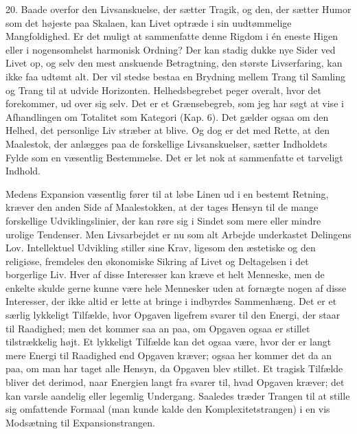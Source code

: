 \documentclass[12pt]{article}
\newcommand{\apage}[1]{\marginnote{\footnotesize\textit{[#1]}}}
\begin{document}
20. Baade overfor den Livsanskuelse, der sætter Tragik, og den, der
sætter Humor som det højeste paa Skalaen, kan Livet optræde i sin
uudtømmelige Mangfoldighed. Er det muligt at sammenfatte denne Rigdom i
én eneste Higen eller i nogensomhelst harmonisk Ordning? Der kan
stadig dukke nye Sider ved Livet op, og selv den mest anskuende
Betragtning, den største Livserfaring, kan ikke faa udtømt alt. Der vil
stedse bestaa en Brydning mellem Trang til Samling og Trang til at
udvide Horizonten. Helhedsbegrebet peger overalt, hvor det forekommer,
ud over sig selv. Det er et Grænsebegreb, som jeg har søgt at vise i
Afhandlingen om Totalitet som Kategori (Kap. 6). Det gælder ogsaa om
den Helhed, det personlige Liv stræber at blive. Og dog er det med
Rette, at den Maalestok, der anlægges paa de forskellige
Livsanskuelser, sætter Indholdets Fylde som en væsentlig Bestemmelse.
Det er let nok at sammenfatte et tarveligt Indhold.

\setcounter{footnote}{0}%
\apage{63}Medens Expansion væsentlig fører til at løbe Linen ud i en bestemt
Retning, kræver den anden Side af Maalestokken, at der tages Hensyn til de
mange forskellige Udviklingslinier, der kan røre sig i Sindet som mere eller
mindre urolige Tendenser. Men Livsarbejdet er nu som alt Arbejde underkastet
Delingens Lov. Intellektuel Udvikling stiller sine Krav, ligesom den æstetiske
og den religiøse, fremdeles den økonomiske Sikring af Livet og Deltagelsen i
det borgerlige Liv. Hver af disse Interesser kan kræve et helt Menneske, men de
enkelte skulde gerne kunne være hele Mennesker uden at fornægte nogen af disse
Interesser, der ikke altid er lette at bringe i indbyrdes Sammenhæng. Det er et
særlig lykkeligt Tilfælde, hvor Opgaven ligefrem svarer til den Energi, der
staar til Raadighed; men det kommer saa an paa, om Opgaven ogsaa er stillet
tilstrækkelig højt. Et lykkeligt Tilfælde kan det ogsaa være, hvor der er langt
mere Energi til Raadighed end Opgaven kræver; ogsaa her kommer det da an paa,
om man har taget alle Hensyn, da Opgaven blev stillet. Et tragisk Tilfælde
bliver det derimod, naar Energien langt fra svarer til, hvad Opgaven kræver;
det kan varsle aandelig eller legemlig Undergang. Saaledes træder Trangen til
at stille sig omfattende Formaal (man kunde kalde den Komplexitetstrangen) i en
vis Modsætning til Expansionstrangen.
\end{document}
